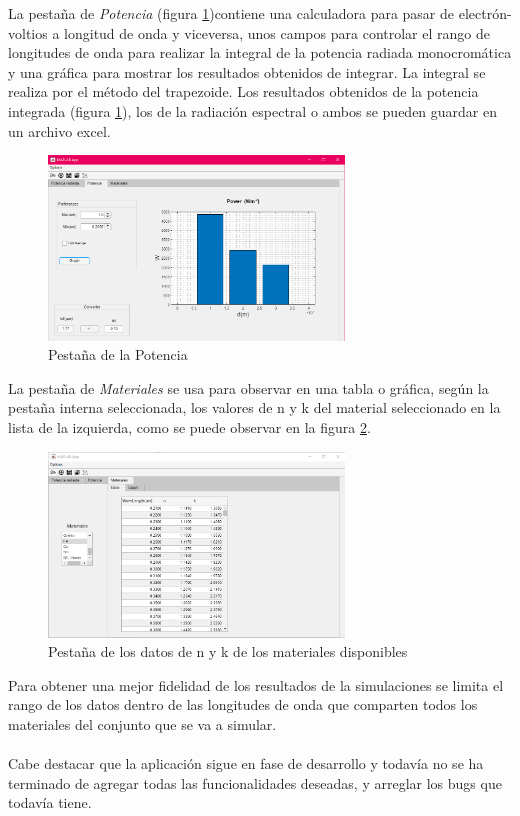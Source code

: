 La pestaña de \textit{Potencia} (figura \ref{fig:pestana_Potencia})contiene una calculadora para pasar de electrón-voltios a longitud de onda y viceversa, unos campos para controlar el rango de longitudes de onda para realizar la integral de la potencia radiada monocromática y una gráfica para mostrar los resultados obtenidos de integrar. La integral se realiza por el método del trapezoide. Los resultados obtenidos de la potencia integrada (figura \ref{fig:pestana_Potencia}), los de la radiación espectral o ambos se pueden guardar en un archivo excel.
\begin{figure}[H]
	\centering
		\includegraphics[width=0.70\textwidth]{figuras/pestana_Potencia.png}
	\caption{Pestaña de la Potencia}
	\label{fig:pestana_Potencia}
\end{figure}
La pestaña de \textit{Materiales} se usa para observar en una tabla o gráfica, según la pestaña interna seleccionada, los valores de n y k del material seleccionado en la lista de la izquierda, como se puede observar en la figura \ref{fig:pestana_materiales}.
\begin{figure}[H]
	\centering
		\includegraphics[width=0.70\textwidth]{figuras/pestana_materiales.png}
	\caption{Pestaña de los datos de n y k  de los materiales disponibles}
	\label{fig:pestana_materiales}
\end{figure}
Para obtener una mejor fidelidad de los resultados de la simulaciones se limita el rango de los datos dentro de las longitudes de onda que comparten todos los materiales del conjunto que se va a simular.\\\\
Cabe destacar que la aplicación sigue en fase de desarrollo y todavía no se ha terminado de agregar todas las funcionalidades deseadas, y arreglar los bugs que todavía tiene.